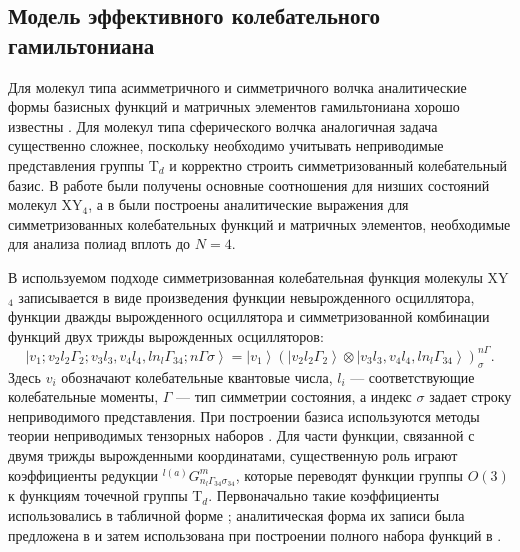 \subsection{Модель эффективного колебательного гамильтониана}

Для молекул типа асимметричного и симметричного волчка аналитические формы базисных функций и
матричных элементов гамильтониана хорошо известны \cite{0101,0102,0103,0104,8855,0105}. Для молекул
типа сферического волчка аналогичная задача существенно сложнее, поскольку необходимо учитывать
неприводимые представления группы T$_d$ и корректно строить симметризованный колебательный базис.
В работе \cite{hecht} были получены основные соотношения для низших состояний молекул XY$_4$, а в
\cite{ulen1,ulen2} были построены аналитические выражения для симметризованных колебательных функций
и матричных элементов, необходимые для анализа полиад вплоть до $N=4$.

В используемом подходе симметризованная колебательная функция молекулы XY$_4$ записывается в виде
произведения функции невырожденного осциллятора, функции дважды вырожденного осциллятора и
симметризованной комбинации функций двух трижды вырожденных осцилляторов:
\begin{equation}
\left| v_1; v_2 l_2 \Gamma_2; v_3 l_3, v_4 l_4, l n_l \Gamma_{34}; n\Gamma\sigma \right\rangle =
\left| v_1 \right\rangle
\left(\left| v_2 l_2 \Gamma_2 \right\rangle \otimes
\left| v_3 l_3, v_4 l_4, l n_l \Gamma_{34} \right\rangle\right)^{n\Gamma}_{\sigma} .
\label{eq:si_basis_function}
\end{equation}
Здесь $v_i$ обозначают колебательные квантовые числа, $l_i$ --- соответствующие колебательные
моменты, $\Gamma$ --- тип симметрии состояния, а индекс $\sigma$ задает строку неприводимого
представления. При построении базиса используются методы теории неприводимых тензорных наборов
\cite{Fano1959,Wigner1965,Varshalovich1988}. Для части функции, связанной с двумя трижды
вырожденными координатами, существенную роль играют коэффициенты редукции
${}^{l(a)}G^m_{n_l\Gamma_{34}\sigma_{34}}$, которые переводят функции группы $O(3)$ к функциям
точечной группы T$_d$. Первоначально такие коэффициенты использовались в табличной форме
\cite{moret,mor2,Champ1,Champ2}; аналитическая форма их записи была предложена в \cite{chegl} и затем
использована при построении полного набора функций в \cite{ulen1,ulen2}.

